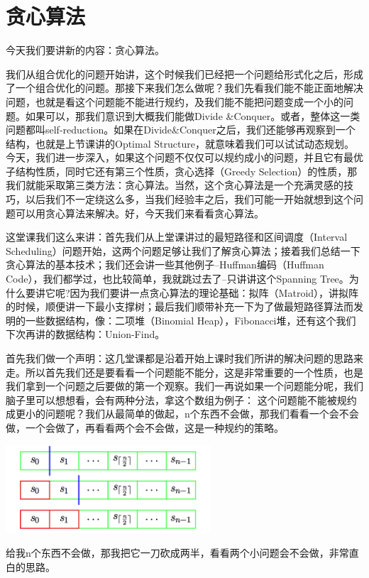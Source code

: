 
\chapter{贪心算法}
今天我们要讲新的内容：贪心算法。

	我们从组合优化的问题开始讲，这个时候我们已经把一个问题给形式化之后，形成了一个组合优化的问题。那接下来我们怎么做呢？我们先看我们能不能正面地解决问题，也就是看这个问题能不能进行规约，及我们能不能把问题变成一个小的问题。如果可以，那我们意识到大概我们能做Divide \&Conquer。或者，整体这一类问题都叫self-reduction。如果在Divide\&Conquer之后，我们还能够再观察到一个结构，也就是上节课讲的Optimal Structure，就意味着我们可以试试动态规划。今天，我们进一步深入，如果这个问题不仅仅可以规约成小的问题，并且它有最优子结构性质，同时它还有第三个性质，贪心选择（Greedy Selection）的性质，那我们就能采取第三类方法：贪心算法。当然，这个贪心算法是一个充满灵感的技巧，以后我们不一定绕这么多，当我们经验丰之后，我们可能一开始就想到这个问题可以用贪心算法来解决。好，今天我们来看看贪心算法。
	
	这堂课我们这么来讲：首先我们从上堂课讲过的最短路径和区间调度（Interval Scheduling）问题开始，这两个问题足够让我们了解贪心算法；接着我们总结一下贪心算法的基本技术；我们还会讲一些其他例子--Huffman编码（Huffman Code），我们都学过，也比较简单，我就跳过去了--只讲讲这个Spanning Tree。为什么要讲它呢?因为我们要讲一点贪心算法的理论基础：拟阵（Matroid），讲拟阵的时候，顺便讲一下最小支撑树；最后我们顺带补充一下为了做最短路径算法而发明的一些数据结构，像：二项堆（Binomial Heap），Fibonacci堆，还有这个我们下次再讲的数据结构：Union-Find。
	
	首先我们做一个声明：这几堂课都是沿着开始上课时我们所讲的解决问题的思路来走。所以首先我们还是要看看一个问题能不能分，这是非常重要的一个性质，也是我们拿到一个问题之后要做的第一个观察。我们一再说如果一个问题能分呢，我们脑子里可以想想看，会有两种分法，拿这个数组为例子：
	这个问题能不能被规约成更小的问题呢？我们从最简单的做起，n个东西不会做，那我们看看一个会不会做，一个会做了，再看看两个会不会做，这是一种规约的策略。
	
	\includegraphics[width=3in]{L5-incremental-dc1.png}
	
	给我n个东西不会做，那我把它一刀砍成两半，看看两个小问题会不会做，非常直白的思路。
	
